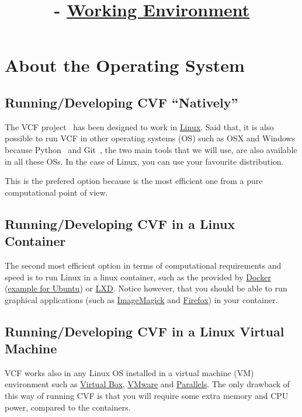 
\title{\SM{} - \href{https://sistemas-multimedia.github.io/working_environment}{Working Environment}}

\maketitle

\tableofcontents

\section{About the Operating System}

\subsection{Running/Developing CVF ``Natively''}
The VCF project~\cite{vruiz__VCF} has been designed to work in
\href{https://en.wikipedia.org/wiki/Linux}{Linux}. Said that, it is
also possible to run VCF in other operating systems (OS) such as OSX
and Windows because Python~\cite{vruiz__YAPT} and
Git~\cite{vruiz__GitHub}, the two main tools that we will use, are
also available in all these OSs. In the case of Linux, you can use
your favourite distribution.

This is the prefered option because is the most efficient one from a
pure computational point of view.

\subsection{Running/Developing CVF in a Linux Container}
The second most efficient option in terms of computational
requirements and speed is to run Linux in a linux container, such
as the provided by \href{https://hub.docker.com/}{Docker}
(\href{https://hub.docker.com/_/ubuntu}{example for Ubuntu})
or \href{https://linuxcontainers.org/}{LXD}. Notice however, that you
should be able to run graphical applications (such
as \href{https://linuxcontainers.org/}{ImageMagick}
and \href{https://www.mozilla.org/firefox}{Firefox}) in your
container.

\subsection{Running/Developing CVF in a Linux Virtual Machine}
VCF works also in any Linux OS installed in a virtual machine (VM)
environment such as \href{https://www.virtualbox.org/}{Virtual Box},
\href{https://www.vmware.com/}{VMware} and \href{https://www.vmware.com/}{Parallels}.
The only drawback of this way of running CVF is that you will require
some extra memory and CPU power, compared to the containers.

